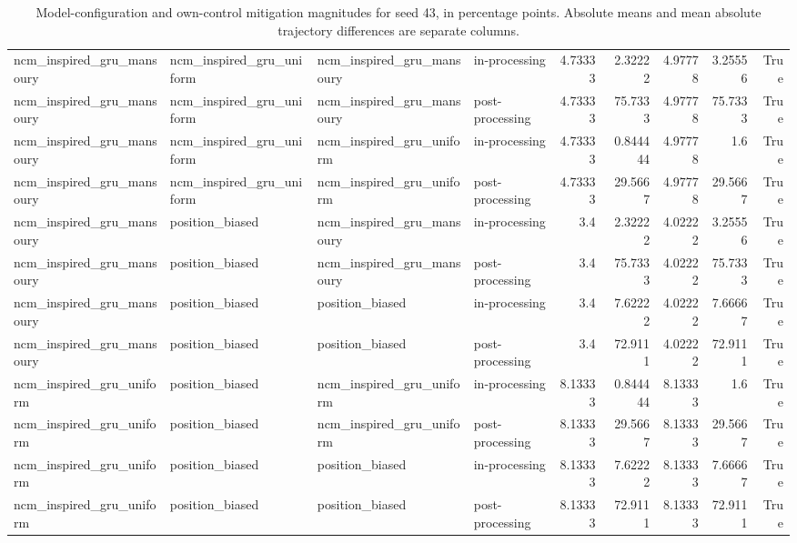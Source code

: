 \begin{table}[htbp!]
\begin{tabular}{llllrrrrr}
ncm\_inspired\_gru\_mansoury & ncm\_inspired\_gru\_uniform & ncm\_inspired\_gru\_mansoury & in-processing & 4.73333 & 2.32222 & 4.97778 & 3.25556 & True \\
ncm\_inspired\_gru\_mansoury & ncm\_inspired\_gru\_uniform & ncm\_inspired\_gru\_mansoury & post-processing & 4.73333 & 75.7333 & 4.97778 & 75.7333 & True \\
ncm\_inspired\_gru\_mansoury & ncm\_inspired\_gru\_uniform & ncm\_inspired\_gru\_uniform & in-processing & 4.73333 & 0.844444 & 4.97778 & 1.6 & True \\
ncm\_inspired\_gru\_mansoury & ncm\_inspired\_gru\_uniform & ncm\_inspired\_gru\_uniform & post-processing & 4.73333 & 29.5667 & 4.97778 & 29.5667 & True \\
ncm\_inspired\_gru\_mansoury & position\_biased & ncm\_inspired\_gru\_mansoury & in-processing & 3.4 & 2.32222 & 4.02222 & 3.25556 & True \\
ncm\_inspired\_gru\_mansoury & position\_biased & ncm\_inspired\_gru\_mansoury & post-processing & 3.4 & 75.7333 & 4.02222 & 75.7333 & True \\
ncm\_inspired\_gru\_mansoury & position\_biased & position\_biased & in-processing & 3.4 & 7.62222 & 4.02222 & 7.66667 & True \\
ncm\_inspired\_gru\_mansoury & position\_biased & position\_biased & post-processing & 3.4 & 72.9111 & 4.02222 & 72.9111 & True \\
ncm\_inspired\_gru\_uniform & position\_biased & ncm\_inspired\_gru\_uniform & in-processing & 8.13333 & 0.844444 & 8.13333 & 1.6 & True \\
ncm\_inspired\_gru\_uniform & position\_biased & ncm\_inspired\_gru\_uniform & post-processing & 8.13333 & 29.5667 & 8.13333 & 29.5667 & True \\
ncm\_inspired\_gru\_uniform & position\_biased & position\_biased & in-processing & 8.13333 & 7.62222 & 8.13333 & 7.66667 & True \\
ncm\_inspired\_gru\_uniform & position\_biased & position\_biased & post-processing & 8.13333 & 72.9111 & 8.13333 & 72.9111 & True \\
\hline
\end{tabular}
\caption{Model-configuration and own-control mitigation magnitudes for seed 43, in percentage points. Absolute means and mean absolute trajectory differences are separate columns.}
\label{chap:results:tab:rq4_model_vs_mitigation_seed_43}
\end{table}
